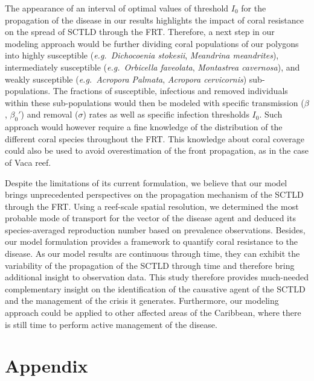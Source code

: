 \documentclass[utf8]{frontiersSCNS}
\newcommand{\eg}{{\it e.g.}\ }
\begin{document}
The appearance of an interval of optimal values of threshold $I_0$ for the propagation of the disease in our results highlights the impact of coral resistance on the spread of SCTLD through the FRT. Therefore, a next step in our modeling approach would be further dividing coral populations of our polygons into highly susceptible (\eg \textit{Dichocoenia stokesii}, \textit{Meandrina meandrites}), intermediately susceptible (\eg \textit{Orbicella faveolata}, \textit{Montastrea cavernosa}), and weakly susceptible (\eg \textit{Acropora Palmata}, \textit{Acropora cervicornis}) sub-populations. The fractions of susceptible, infectious and removed individuals within these sub-populations would then be modeled with specific transmission ($\beta$, $\beta_0'$) and removal ($\sigma$) rates as well as specific infection thresholds $I_0$. Such approach would however require a fine knowledge of the distribution of the different coral species throughout the FRT. This knowledge about coral coverage could also be used to avoid overestimation of the front propagation, as in the case of Vaca reef.

Despite the limitations of its current formulation, we believe that our model brings unprecedented perspectives on the propagation mechanism of the SCTLD through the FRT. Using a reef-scale spatial resolution, we determined the most probable mode of transport for the vector of the disease agent and deduced its species-averaged reproduction number based on prevalence observations. Besides, our model formulation provides a framework to quantify coral resistance to the disease. As our model results are continuous through time, they can exhibit the variability of the propagation of the SCTLD through time and therefore bring additional insight to observation data. This study therefore provides much-needed complementary insight on the identification of the causative agent of the SCTLD and the management of the crisis it generates. Furthermore, our modeling approach could be applied to other affected areas of the Caribbean, where there is still time to perform active management of the disease.

\appendix
\section*{Appendix}
% 
\end{document}
